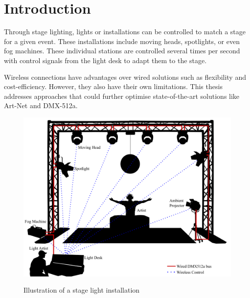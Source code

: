 \chapter{Introduction}


Through stage lighting, lights or installations can be controlled to match a stage for a given event.
These installations include moving heads, spotlights, or even fog machines.
These individual stations are controlled several times per second with control signals from the light desk
to adapt them to the stage.

Wireless connections have advantages over wired solutions such as flexibility and cost-efficiency.
However, they also have their own limitations.
This thesis addresses approaches that could further optimise state-of-the-art solutions like Art-Net and DMX-512a.

\begin{figure}[h]
    \centering
    \includegraphics[scale=0.55]{figures/illustration.pdf}
    \label{fig:illustration}
    \caption{Illustration of a stage light installation}
\end{figure}


